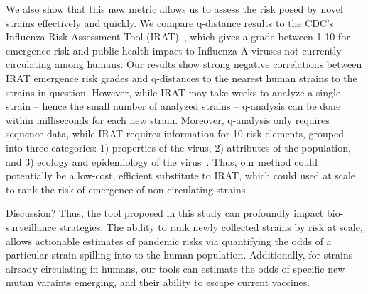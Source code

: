 \documentclass[onecolumn, compsoc,10pt]{IEEEtran}
\begin{document}
We also show that this new metric allows us to  assess the risk posed by novel strains  effectively and quickly. We compare q-distance results to the CDC's Influenza Risk Assessment Tool (IRAT)~\cite{Influenz24:online}, which gives a grade between 1-10 for emergence risk and public health impact to Influenza A viruses not currently circulating among humans. Our results show strong negative correlations between IRAT emergence risk grades and q-distances to the nearest human strains to the strains in question. However, while IRAT may take weeks to analyze a single strain -- hence the small number of analyzed strains -- q-analysis can be done within milliseconds for each new strain. Moreover, q-analysis only requires sequence data, while IRAT requires information for 10 risk elements, grouped into three categories: 1) properties of the virus, 2) attributes of the population, and 3) ecology and epidemiology of the virus~\cite{Influenz24:online}. Thus, our method could potentially be a low-cost, efficient substitute to IRAT, which could used at scale to rank the risk of emergence of non-circulating strains.

{\color{Red1} Discussion? 
Thus, the tool proposed in this study  can  profoundly impact  bio-surveillance strategies. The ability to rank newly collected strains by risk at scale, allows actionable estimates of  pandemic risks via  quantifying the odds of a particular strain spilling into to the human population. Additionally,  for strains already circulating in humans, our tools can estimate the odds  of specific  new mutan varaints emerging, and their ability to  escape current vaccines. %
}
\end{document}
